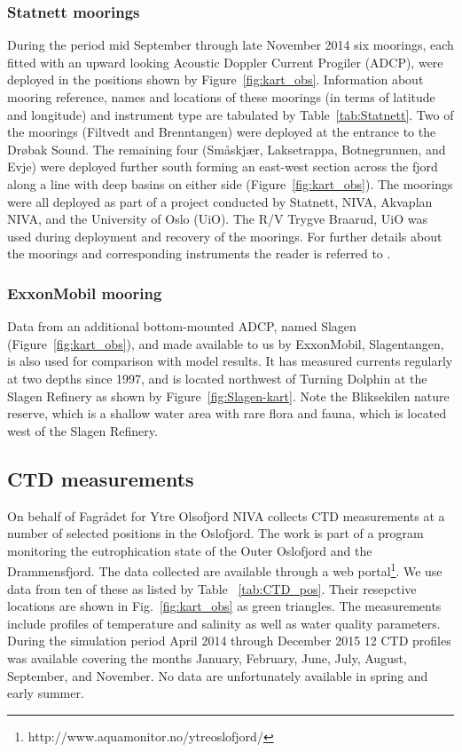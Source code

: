 \subsubsection{Statnett moorings}
During the period mid September through late November 2014 six moorings, each fitted with an upward looking Acoustic Doppler Current Progiler (ADCP), were deployed in the positions shown by Figure~\ref{fig:kart_obs}. Information about mooring reference, names and locations of these moorings (in terms of latitude and longitude) and instrument type are tabulated by Table~\ref{tab:Statnett}. Two of the moorings (Filtvedt and Brenntangen) were deployed at the entrance to the Dr{\o}bak Sound. The remaining four (Sm{\aa}skj{\ae}r, Laksetrappa, Botnegrunnen, and Evje) were deployed further south forming an east-west section across the fjord along a line with deep basins on either side (Figure~\ref{fig:kart_obs}). The moorings were all deployed as part of a project conducted by Statnett, NIVA, Akvaplan NIVA, and the University of Oslo (UiO). The R/V Trygve Braarud, UiO was used during deployment and recovery of the moorings. For further details about the moorings and corresponding instruments the reader is referred to \cite{staalstrom:2015}.


\subsubsection{ExxonMobil mooring}
Data from an additional bottom-mounted ADCP, named Slagen (Figure~\ref{fig:kart_obs}), and made available to us by ExxonMobil, Slagentangen, is also used for comparison with model results. It has measured currents regularly at two depths since 1997, and is located northwest of Turning Dolphin at the Slagen Refinery as shown by Figure~\ref{fig:Slagen-kart}. Note the Bliksekilen nature reserve, which is a shallow water area with rare flora and fauna, which is located west of the Slagen Refinery. 


\subsection{CTD measurements}
\label{subsec:CTDo}
On behalf of Fagr{\aa}det for Ytre Olsofjord NIVA collects CTD measurements at a number of selected positions in the Oslofjord. The work is part of a program monitoring the eutrophication state of the Outer Oslofjord and the Drammensfjord. The data collected are available through a web portal\footnote{http://www.aquamonitor.no/ytreoslofjord/}. We use data from ten of these as listed by Table ~\ref{tab:CTD_pos}. Their resepctive locations are shown in Fig.~\ref{fig:kart_obs} as green triangles. The measurements include profiles of temperature and salinity as well as water quality parameters. During the simulation period April 2014 through December 2015 12 CTD profiles was available covering the months January, February, June, July, August, September, and November. No data are unfortunately available in spring and early summer. 


